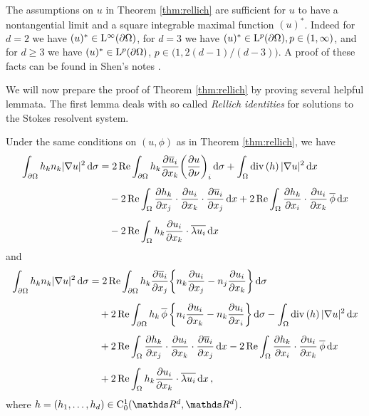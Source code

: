 \begin{rem}
  \label{rem:shenNontangential}
  The assumptions on $u$ in Theorem \ref{thm:rellich} are sufficient for $u$ to have a nontangential limit and a square integrable maximal function $(u)^*$. 
  Indeed for $d = 2$ we have $(u)^* \in \mathrm{L}^\infty(\partial\Omega)$, for $d = 3$ we have $(u)^* \in \mathrm{L}^p(\partial\Omega), p \in (1,\infty)$, and for $d \geq 3$ we have $(u)^* \in \mathrm{L}^p(\partial\Omega)$, $p \in \big(1, 2 (d - 1) / (d - 3) \big)$.
  A proof of these facts can be found in Shen's notes \cite[Prop. 7.1.3]{Shen2017}.
\end{rem}

We will now prepare the proof of Theorem \ref{thm:rellich} by proving several helpful lemmata.
The first lemma deals with so called \emph{Rellich identities} for solutions to the Stokes resolvent system.

\begin{lem}
  \label{lem:rellichIdentity}
  Under the same conditions on $(u,\phi)$ as in Theorem \ref{thm:rellich}, we have
  \begin{align}
    \int_{\partial\Omega} h_k n_k |\nabla u|^2 \, {\operatorname{d}\!{\sigma}} 
    &= 2 \operatorname{Re} \int_{\partial\Omega} h_k \frac{\partial \overline u_i}{\partial x_k} \bigg( \frac{\partial u}{\partial \nu} \bigg)_i \, {\operatorname{d}\!{\sigma}} + \int_\Omega \mathrm{div\,} (h)\, |\nabla u|^2 \, {\operatorname{d}\!{x}} \nonumber\\[0.5em]
    &\quad - 2 \operatorname{Re} \int_\Omega \frac{\partial h_k}{\partial x_j} \cdot \frac{\partial u_i}{\partial x_k} \cdot \frac{\partial \overline u_i}{\partial x_j} \, {\operatorname{d}\!{x}} + 2 \operatorname{Re} \int_\Omega \frac{\partial h_k}{\partial x_i} \cdot \frac{\partial u_i}{\partial x_k} \, \overline \phi \, {\operatorname{d}\!{x}} \nonumber\\[0.5em]
    &\quad - 2 \operatorname{Re} \int_\Omega h_k \frac{\partial u_i}{\partial x_k} \cdot \overline {\lambda u_i} \, {\operatorname{d}\!{x}} \label{eq:rellichIdentity}
  \end{align}
  and
  \begin{align}
    \int_{\partial\Omega} h_k n_k |\nabla u|^2 \, {\operatorname{d}\!{\sigma}}
    &= 2\operatorname{Re} \int_{\partial\Omega} h_k \frac{\partial \overline u_i}{\partial x_j} \bigg\{ n_k \frac{\partial u_i}{\partial x_j} - n_j \frac{\partial u_i}{\partial x_k} \bigg\} \, {\operatorname{d}\!{\sigma}} \nonumber\\[0.5em]
    &\quad + 2 \operatorname{Re} \int_{\partial\Omega} h_k \, \overline \phi \, \bigg\{ n_i \frac{\partial u_i}{\partial x_k} - n_k \frac{\partial u_i}{\partial x_i} \bigg\} \, {\operatorname{d}\!{\sigma}} - \int_\Omega \mathrm{div\,} (h)\, |\nabla u|^2 \, {\operatorname{d}\!{x}} \nonumber\\[0.5em]
    &\quad + 2 \operatorname{Re} \int_\Omega \frac{\partial h_k}{\partial x_j} \cdot \frac{\partial u_i}{\partial x_k} \cdot \frac{\partial \overline u_i}{\partial x_j} \, {\operatorname{d}\!{x}} - 2 \operatorname{Re} \int_\Omega \frac{\partial h_k}{\partial x_i} \cdot \frac{\partial u_i}{\partial x_k} \, \overline \phi \, {\operatorname{d}\!{x}} \nonumber\\[0.5em]
    &\quad + 2 \operatorname{Re} \int_\Omega h_k \frac{\partial u_i}{\partial x_k} \cdot \overline{ \lambda u_i} \, {\operatorname{d}\!{x}}\,, \label{eq:rellichIdentity2}
  \end{align}
  where $h = (h_1, \dots,h_d) \in \CC_0^1(\R^d, \R^d)$.
\end{lem}

